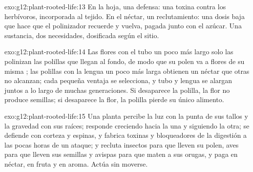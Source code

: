 \begin{solution}{exo:g12:plant-rooted-life:13}
En la hoja, una defensa: una toxina contra los herbívoros, incorporada
al tejido. En el néctar, un reclutamiento: una dosis baja que hace que
el polinizador recuerde y vuelva, pagada junto con el azúcar. Una
sustancia, dos necesidades, dosificada según el sitio.
\end{solution}

\begin{solution}{exo:g12:plant-rooted-life:14}
Las flores con el tubo un poco más largo solo las polinizan las
polillas que llegan al fondo, de modo que su polen va a flores de su
misma ; las polillas con la lengua un poco más larga obtienen un
néctar que otras no alcanzan; cada pequeña ventaja se selecciona, y
tubo y lengua se alargan juntos a lo largo de muchas generaciones. Si
desaparece la polilla, la flor no produce semillas; si desaparece la
flor, la polilla pierde su único alimento.
\end{solution}

\begin{solution}{exo:g12:plant-rooted-life:15}
Una planta percibe la luz con la punta de sus tallos y la gravedad con
sus raíces; responde creciendo hacia la una y siguiendo la otra; se
defiende con corteza y espinas, y fabrica toxinas y bloqueadores de la
digestión a las pocas horas de un ataque; y recluta insectos para que
lleven su polen, aves para que lleven sus semillas y avispas para que
maten a sus orugas, y paga en néctar, en fruta y en aroma. Actúa sin
moverse.
\end{solution}

